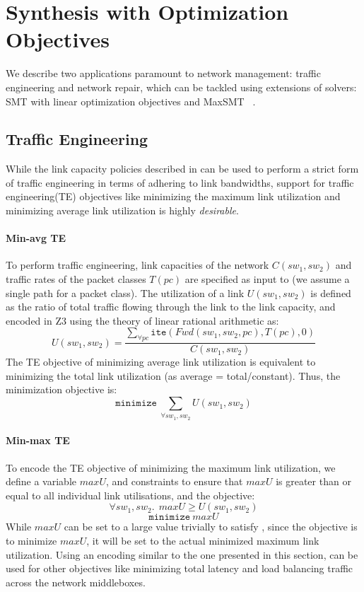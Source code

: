 \section{Synthesis with Optimization Objectives}
We describe two applications paramount to network management:
traffic engineering and network repair, which can be tackled using
extensions of solvers: SMT with linear optimization objectives and MaxSMT ~\cite{}.
\subsection{Traffic Engineering}
While the link capacity policies described in  can
be used to perform a strict form of traffic engineering in terms of 
adhering to link bandwidths, support for traffic engineering(TE) objectives
like minimizing the maximum link utilization and minimizing average link utilization
is highly \emph{desirable}.

\paragraph{Min-avg TE}
To perform traffic engineering, link capacities of the network $C(sw_1, sw_2)$ and traffic 
rates of the packet classes $T(pc)$ are specified as input to \name (we assume a single
path for a packet class). The utilization 
of a link $U(sw_1, sw_2)$ is defined as the ratio of total traffic flowing through the link to the 
link capacity, and encoded in Z3 using the theory of linear rational arithmetic as:
\begin{equation}
U(sw_1, sw_2) = \frac{\sum_{\forall pc} \texttt{ite}(Fwd(sw_1,sw_2, pc), T(pc), 0)} {C(sw_1, sw_2)}
\end{equation}
The TE objective of minimizing average link utilization is equivalent to minimizing
the total link utilization (as average = total/constant). Thus, the minimization
objective is:
\begin{equation}
	\texttt{minimize}\ \sum_{\forall sw_1, sw_2} U(sw_1, sw_2)
\end{equation}
\paragraph{Min-max TE}
To encode the TE objective of minimizing the maximum link utilization, we define
a variable $maxU$, and constraints to ensure that $maxU$ is greater than or equal to all 
individual link utilisations, and the objective: 
\begin{equation} \label{eq:maxu}
\forall sw_1, sw_2.\ \ maxU \geq U(sw_1, sw_2)
\end{equation} 
\begin{equation}
		\texttt{minimize}\ maxU
\end{equation}
While $maxU$ can be set to a large value trivially to satisfy 
, since the objective is to minimize $maxU$, it will be set to the actual
minimized maximum link utilization. Using an encoding similar to the one presented in this section, \name can be used for other objectives like minimizing total latency and load balancing
traffic across the network middleboxes.


